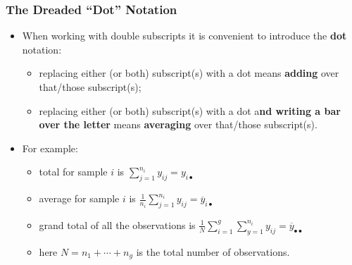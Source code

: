 \documentclass[a4paper]{article}
\begin{document}
\subsubsection{The Dreaded ``Dot'' Notation}
\begin{itemize}
	\item When working with double subscripts it is convenient to introduce the \textbf{dot} notation:
	\begin{itemize}
		\item replacing either (or both) subscript(s) with a dot means \textbf{adding} over that/those subscript(s);
		\item replacing either (or both) subscript(s) with a dot a\textbf{nd writing a bar over the letter} means \textbf{averaging} over that/those subscript(s).
	\end{itemize}
	\item For example:
	\begin{itemize}
		\item total for sample \( i \) is \( \sum_{j=1}^{n_i} y_{ij} = y_{i \bullet} \)
		\item average for sample \( i \) is \( \frac{1}{n_i} \sum_{j=1}^{n_i} y_{ij} = \overline{y}_{i \bullet} \) 
		\item grand total of all the observations is \( \frac{1}{N} \sum_{i=1}^{g} \sum_{y=1}^{n_i} y_{ij} = \overline{y}_{\bullet\bullet} \)
		\item here \( N = n_1 + \dotsb + n_g \) is the total number of observations. 
	\end{itemize}
\end{itemize}
\end{document}
